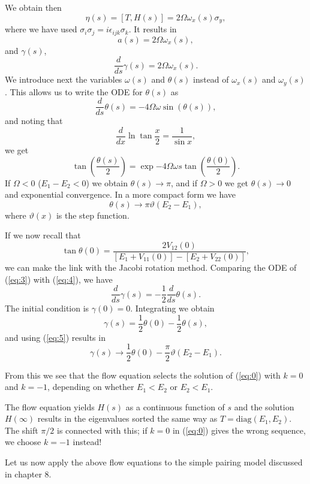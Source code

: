 We obtain then
\[ \eta(s) = [T, H(s)] = 2\Omega\omega_x(s)\sigma_y, \]
where we have used $\sigma_i\sigma_j = i\epsilon_{ijk}\sigma_k$.
It results in
\[ a(s) = 2\Omega \omega_x(s), \]
and $\gamma(s)$,
\begin{equation} \frac{d}{ds} \gamma(s) = 2\Omega\omega_x(s). \label{eq:3}\end{equation}
We introduce next the  variables $\omega(s)$ and $\theta(s)$ instead of
$\omega_x(s)$ and $\omega_y(s)$. This allows us to write the ODE 
for $\theta(s)$ as
\begin{equation} 
\frac{d}{ds} \theta(s) = -4\Omega\omega \sin(\theta(s)), \label{eq:4}
\end{equation}
and noting that
\[ 
\frac{d}{dx} \ln \tan \frac{x}{2} = \frac{1}{\sin x}, 
\]
we get
\[ 
\tan\left(\frac{\theta(s)}{2}\right) = \exp{-4\Omega\omega s} \tan\left(
  \frac{\theta(0)}{2}\right). 
\]
If $\Omega<0$ ($E_1-E_2<0$) we obtain  $\theta(s)\rightarrow \pi$, and if 
$\Omega>0$ we get  $\theta(s)\rightarrow 0$ and exponential convergence. In a more 
compact form we have
\begin{equation} \theta(s) \rightarrow \pi \vartheta(E_2 - E_1),
  \label{eq:5} \end{equation}
where $\vartheta(x)$ is the  step function.

If we now recall that 
\[ \tan \theta(0) = \frac{2 V_{12}(0) }{[E_1 + V_{11}(0)]- [E_2 +
  V_{22}(0)]},
\]
we can make the link with the Jacobi rotation method. Comparing the  ODE of (\ref{eq:3}) with 
(\ref{eq:4}), we have
\[ \frac{d}{ds} \gamma(s) = -\frac{1}{2} \frac{d}{ds} \theta(s). \]
The initial condition is 
$\gamma(0) = 0$. Integrating we obtain 
\[ \gamma(s) = \frac{1}{2}\theta(0) - \frac{1}{2}\theta(s), \]
and using (\ref{eq:5}) results in 
\[ \gamma(s) \rightarrow \frac{1}{2}\theta(0) -
\frac{\pi}{2}\vartheta(E_2-E_1). \]

From this we see that the flow equation selects the solution of (\ref{eq:0}) with
$k=0$ and $k=-1$, depending on whether  $E_1<E_2$ or $E_2<E_1$.

The flow equation yields $H(s)$ as a continuous function of $s$ and the solution
$H(\infty)$ results in the eigenvalues sorted the same way as
$T = \mathrm{diag}(E_1,E_2)$. The shift $\pi/2$ is connected with this; if $k=0$ in 
(\ref{eq:0}) gives the wrong sequence, we choose $k=-1$ instead!

Let us now apply the above flow equations to the simple pairing model discussed in chapter 8. 

